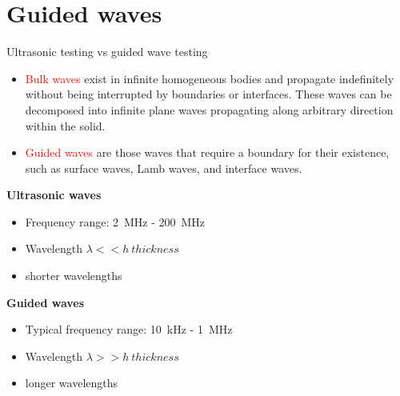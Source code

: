 \documentclass[10pt,aspectratio=169]{beamer} %
\begin{document}
\section{Guided waves}
\begin{frame}{Ultrasonic testing vs guided wave testing}
	\begin{itemize}
		\item \textcolor{red}{Bulk waves} exist in infinite homogeneous bodies and propagate indefinitely without being interrupted by boundaries or interfaces. 
		These waves can be decomposed into infinite plane waves propagating along arbitrary direction within the solid. 
		\item \textcolor{red}{Guided waves} are those waves that require a boundary for their existence, such as surface waves, Lamb waves, and interface waves.
	\end{itemize}
	\begin{minipage}[c]{.45\textwidth}
		\textbf{Ultrasonic waves}
		\begin{itemize}
			\item Frequency range: 2~MHz - 200~MHz
			\item Wavelength \(\lambda<<h\ thickness\)
			\item shorter wavelengths
		\end{itemize}
	\end{minipage}
	\hfill
	\begin{minipage}[c]{.48\textwidth}
		\textbf{Guided waves}
		\begin{itemize}
			\item Typical frequency range: 10~kHz - 1~MHz
			\item Wavelength \(\lambda>>h\ thickness\)
			\item longer wavelengths
		\end{itemize}
	\end{minipage}		
\end{frame}
\end{document}
